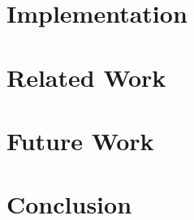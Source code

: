 \documentclass{article}
\begin{document}

\section{Implementation}
\label{sec:implementation}


\section{Related Work}
\label{sec:related-work}


\section{Future Work}
\label{sec:future-work}

\section{Conclusion}
\label{sec:conclusion}

\printbibliography
\end{document}
